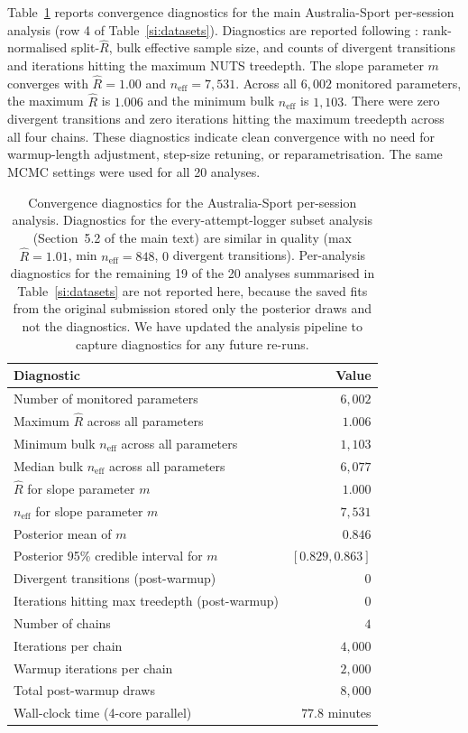 \documentclass[11pt]{article}
\begin{document}
Table~\ref{si:diag-aus-sport} reports convergence diagnostics for the main Australia-Sport per-session analysis (row 4 of Table~\ref{si:datasets}). Diagnostics are reported following \citet{vehtari2021rank}: rank-normalised split-$\hat{R}$, bulk effective sample size, and counts of divergent transitions and iterations hitting the maximum NUTS treedepth. The slope parameter $m$ converges with $\hat{R} = 1.00$ and $n_{\mathrm{eff}} = 7{,}531$. Across all $6{,}002$ monitored parameters, the maximum $\hat{R}$ is $1.006$ and the minimum bulk $n_{\mathrm{eff}}$ is $1{,}103$. There were zero divergent transitions and zero iterations hitting the maximum treedepth across all four chains. These diagnostics indicate clean convergence with no need for warmup-length adjustment, step-size retuning, or reparametrisation. The same MCMC settings were used for all 20 analyses.

\begin{table}[ht]
\centering
\begin{tabular}{lr}
\toprule
{\bf Diagnostic} & {\bf Value} \\
\midrule
Number of monitored parameters & $6{,}002$ \\
Maximum $\hat{R}$ across all parameters & $1.006$ \\
Minimum bulk $n_{\mathrm{eff}}$ across all parameters & $1{,}103$ \\
Median bulk $n_{\mathrm{eff}}$ across all parameters & $6{,}077$ \\
$\hat{R}$ for slope parameter $m$ & $1.000$ \\
$n_{\mathrm{eff}}$ for slope parameter $m$ & $7{,}531$ \\
Posterior mean of $m$ & $0.846$ \\
Posterior 95\% credible interval for $m$ & $[0.829, 0.863]$ \\
Divergent transitions (post-warmup) & $0$ \\
Iterations hitting max treedepth (post-warmup) & $0$ \\
Number of chains & $4$ \\
Iterations per chain & $4{,}000$ \\
Warmup iterations per chain & $2{,}000$ \\
Total post-warmup draws & $8{,}000$ \\
Wall-clock time (4-core parallel) & $77.8$ minutes \\
\bottomrule
\end{tabular}
\caption{Convergence diagnostics for the Australia-Sport per-session analysis. Diagnostics for the every-attempt-logger subset analysis (Section~5.2 of the main text) are similar in quality (max $\hat{R} = 1.01$, min $n_{\mathrm{eff}} = 848$, $0$ divergent transitions). Per-analysis diagnostics for the remaining 19 of the 20 analyses summarised in Table~\ref{si:datasets} are not reported here, because the saved fits from the original submission stored only the posterior draws and not the diagnostics. We have updated the analysis pipeline to capture diagnostics for any future re-runs.}
\label{si:diag-aus-sport}
\end{table}
\end{document}
